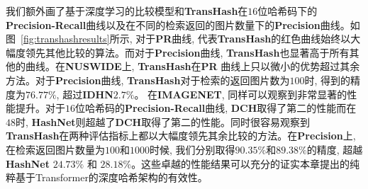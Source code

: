 我们额外画了基于深度学习的比较模型和\textbf{TransHash}在$16$位哈希码下的\textbf{Precision-Recall}曲线以及在不同的检索返回的图片数量下的\textbf{Precision}曲线。如图~\ref{fig:transhashresults}所示, 对于\textbf{PR}曲线, 代表\textbf{TransHash}的红色曲线始终以大幅度领先其他比较的算法。而对于\textbf{Precision}曲线, \textbf{TransHash}也显著高于所有其他的曲线。在\textbf{NUSWIDE}上, \textbf{TransHash}在\textbf{PR} 曲线上只以微小的优势超过其余方法。对于\textbf{Precision}曲线, \textbf{TransHash}对于检索的返回图片数为$100$时, 得到的精度为$76.77 \%$, 超过\textbf{IDHN}$2.7 \%$。 在\textbf{IMAGENET}, 同样可以观察到非常显著的性能提升。对于$16$位哈希码的\textbf{Precision-Recall}曲线, \textbf{DCH}取得了第二的性能而在$48$时, \textbf{HashNet}则超越了\textbf{DCH}取得了第二的性能。同时很容易观察到\textbf{TransHash}在两种评估指标上都以大幅度领先其余比较的方法。在\textbf{Precision}上, 在检索返回图片数量为$100$和$1000$时候, 我们分别取得$90.35\%$和$ 89.38\%$的精度, 超越\textbf{HashNet} $24.73\%$ 和 $28.18 \%$。这些卓越的性能结果可以充分的证实本章提出的纯粹基于Transformer的深度哈希架构的有效性。


